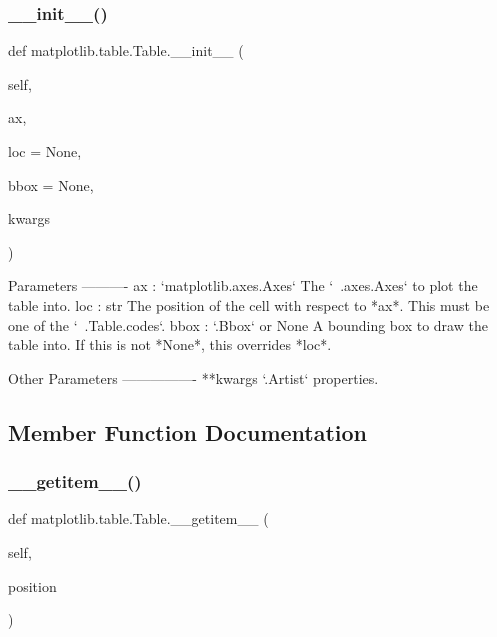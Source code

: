 \subsubsection{\texorpdfstring{\+\_\+\+\_\+init\+\_\+\+\_\+()}{\_\_init\_\_()}}
{\footnotesize\ttfamily def matplotlib.\+table.\+Table.\+\_\+\+\_\+init\+\_\+\+\_\+ (\begin{DoxyParamCaption}\item[{}]{self,  }\item[{}]{ax,  }\item[{}]{loc = {\ttfamily None},  }\item[{}]{bbox = {\ttfamily None},  }\item[{}]{kwargs }\end{DoxyParamCaption})}

\begin{DoxyVerb}Parameters
----------
ax : `matplotlib.axes.Axes`
    The `~.axes.Axes` to plot the table into.
loc : str
    The position of the cell with respect to *ax*. This must be one of
    the `~.Table.codes`.
bbox : `.Bbox` or None
    A bounding box to draw the table into. If this is not *None*, this
    overrides *loc*.

Other Parameters
----------------
**kwargs
    `.Artist` properties.
\end{DoxyVerb}
 

\subsection{Member Function Documentation}
\mbox{\label{classmatplotlib_1_1table_1_1Table_a7b47a53228d1b4a82c375db6d8f2eef4}} 
\subsubsection{\texorpdfstring{\+\_\+\+\_\+getitem\+\_\+\+\_\+()}{\_\_getitem\_\_()}}
{\footnotesize\ttfamily def matplotlib.\+table.\+Table.\+\_\+\+\_\+getitem\+\_\+\+\_\+ (\begin{DoxyParamCaption}\item[{}]{self,  }\item[{}]{position }\end{DoxyParamCaption})}

